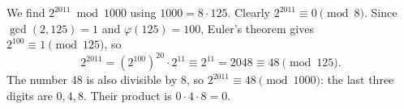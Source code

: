 We find $2^{2011}\bmod 1000$ using $1000=8\cdot125$. Clearly $2^{2011}\equiv0\pmod 8$. Since $\gcd(2,125)=1$ and $\varphi(125)=100$, Euler's theorem gives $2^{100}\equiv1\pmod{125}$, so
\[
2^{2011}=\left(2^{100}\right)^{20}\cdot2^{11}\equiv2^{11}=2048\equiv48\pmod{125}.
\]
The number $48$ is also divisible by $8$, so $2^{2011}\equiv48\pmod{1000}$: the last three digits are $0,4,8$. Their product is $0\cdot4\cdot8=\boxed{0}$.
